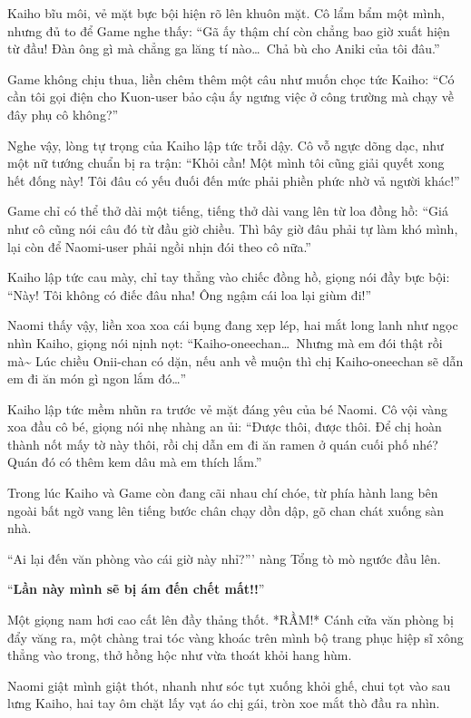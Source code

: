 \documentclass[../main.tex]{subfiles}
\begin{document}
Kaiho bĩu môi, vẻ mặt bực bội hiện rõ lên khuôn mặt. Cô lẩm bẩm một mình, nhưng đủ to để Game nghe thấy: ``Gã ấy thậm chí còn chẳng bao giờ xuất hiện từ đầu! Đàn ông gì mà chẳng ga lăng tí nào\dots\ Chả bù cho Aniki của tôi đâu.''

Game không chịu thua, liền chêm thêm một câu như muốn chọc tức Kaiho: ``Có cần tôi gọi điện cho Kuon-user bảo cậu ấy ngưng việc ở công trường mà chạy về đây phụ cô không?''

Nghe vậy, lòng tự trọng của Kaiho lập tức trỗi dậy. Cô vỗ ngực dõng dạc, như một nữ tướng chuẩn bị ra trận: ``Khỏi cần! Một mình tôi cũng giải quyết xong hết đống này! Tôi đâu có yếu đuối đến mức phải phiền phức nhờ vả người khác!''

Game chỉ có thể thở dài một tiếng, tiếng thở dài vang lên từ loa đồng hồ: ``Giá như cô cũng nói câu đó từ đầu giờ chiều. Thì bây giờ đâu phải tự làm khó mình, lại còn để Naomi-user phải ngồi nhịn đói theo cô nữa.''

Kaiho lập tức cau mày, chỉ tay thẳng vào chiếc đồng hồ, giọng nói đầy bực bội: ``Này! Tôi không có điếc đâu nha! Ông ngậm cái loa lại giùm đi!''

Naomi thấy vậy, liền xoa xoa cái bụng đang xẹp lép, hai mắt long lanh như ngọc nhìn Kaiho, giọng nói nịnh nọt: ``Kaiho-oneechan\dots\ Nhưng mà em đói thật rồi mà\~{} Lúc chiều Onii-chan có dặn, nếu anh về muộn thì chị Kaiho-oneechan sẽ dẫn em đi ăn món gì ngon lắm đó\dots''

Kaiho lập tức mềm nhũn ra trước vẻ mặt đáng yêu của bé Naomi. Cô vội vàng xoa đầu cô bé, giọng nói nhẹ nhàng an ủi: ``Được thôi, được thôi. Để chị hoàn thành nốt mấy tờ này thôi, rồi chị dẫn em đi ăn ramen ở quán cuối phố nhé? Quán đó có thêm kem dâu mà em thích lắm.''

Trong lúc Kaiho và Game còn đang cãi nhau chí chóe, từ phía hành lang bên ngoài bất ngờ vang lên tiếng bước chân chạy dồn dập, gõ chan chát xuống sàn nhà.

``Ai lại đến văn phòng vào cái giờ này nhỉ?''' nàng Tổng tò mò ngước đầu lên.

``\textbf{Lần này mình sẽ bị ám đến chết mất!!}''

Một giọng nam hơi cao cất lên đầy thảng thốt. *RẦM!* Cánh cửa văn phòng bị đẩy văng ra, một chàng trai tóc vàng khoác trên mình bộ trang phục hiệp sĩ xông thẳng vào trong, thở hồng hộc như vừa thoát khỏi hang hùm.

Naomi giật mình giật thót, nhanh như sóc tụt xuống khỏi ghế, chui tọt vào sau lưng Kaiho, hai tay ôm chặt lấy vạt áo chị gái, tròn xoe mắt thò đầu ra nhìn.
\end{document}
